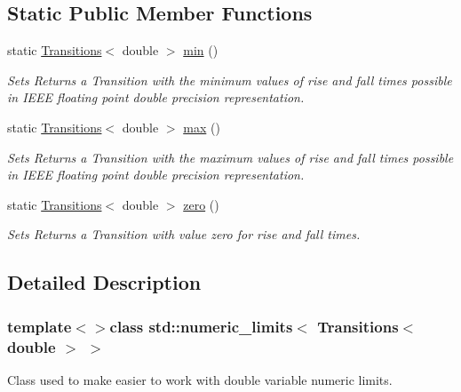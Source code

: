 \subsection*{Static Public Member Functions}
\begin{DoxyCompactItemize}
\item 
static \hyperlink{classTransitions}{Transitions}$<$ double $>$ \hyperlink{classstd_1_1numeric__limits_3_01Transitions_3_01double_01_4_01_4_aaf2bf171cb5f11b864b09798f6d63460}{min} ()
\begin{DoxyCompactList}\small\item\em Sets Returns a Transition with the minimum values of rise and fall times possible in I\-E\-E\-E floating point double precision representation. \end{DoxyCompactList}\item 
static \hyperlink{classTransitions}{Transitions}$<$ double $>$ \hyperlink{classstd_1_1numeric__limits_3_01Transitions_3_01double_01_4_01_4_aac0b30f8990c636cda3f083b95e626a4}{max} ()
\begin{DoxyCompactList}\small\item\em Sets Returns a Transition with the maximum values of rise and fall times possible in I\-E\-E\-E floating point double precision representation. \end{DoxyCompactList}\item 
static \hyperlink{classTransitions}{Transitions}$<$ double $>$ \hyperlink{classstd_1_1numeric__limits_3_01Transitions_3_01double_01_4_01_4_ab17fbee311d6e67204ca678d02ba1e80}{zero} ()
\begin{DoxyCompactList}\small\item\em Sets Returns a Transition with value zero for rise and fall times. \end{DoxyCompactList}\end{DoxyCompactItemize}


\subsection{Detailed Description}
\subsubsection*{template$<$$>$class std\-::numeric\-\_\-limits$<$ Transitions$<$ double $>$ $>$}

Class used to make easier to work with double variable numeric limits. 



